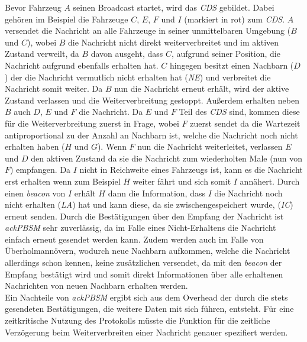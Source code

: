 \documentclass[english,runningheads,a4paper]{llncs}[2018/03/10]
\begin{document}
Bevor Fahrzeug $A$ seinen Broadcast startet, wird das \textit{CDS} gebildet.
Dabei gehören im Beispiel die Fahrzeuge $C$, $E$, $F$ und $I$ (markiert in rot) zum \textit{CDS}.
$A$ versendet die Nachricht an alle Fahrzeuge in seiner unmittelbaren Umgebung ($B$ und $C$), wobei $B$ die Nachricht nicht direkt weiterverbreitet und im aktiven Zustand verweilt, da $B$ davon ausgeht, dass $C$, aufgrund seiner Position, die Nachricht aufgrund ebenfalls erhalten hat.
$C$ hingegen besitzt einen Nachbarn ($D$) der die Nachricht vermutlich nicht erhalten hat (\textit{NE}) und verbreitet die Nachricht somit weiter.
Da $B$ nun die Nachricht erneut erhält, wird der aktive Zustand verlassen und die Weiterverbreitung gestoppt.
Außerdem erhalten neben $B$ auch $D$, $E$ und $F$ die Nachricht.
Da $E$ und $F$ Teil des \textit{CDS} sind, kommen diese für die Weiterverbreitung zuerst in Frage, wobei $F$ zuerst sendet da die Wartezeit antiproportional zu der Anzahl an Nachbarn ist, welche die Nachricht noch nicht erhalten haben ($H$ und $G$).
Wenn $F$ nun die Nachricht weiterleitet, verlassen $E$ und $D$ den aktiven Zustand da sie die Nachricht zum wiederholten Male (nun von $F$) empfangen.
Da $I$ nicht in Reichweite eines Fahrzeugs ist, kann es die Nachricht erst erhalten wenn zum Beispiel $H$ weiter fährt und sich somit $I$ annähert.
Durch einen \textit{beacon} von $I$ erhält $H$ dann die Information, dass $I$ die Nachricht noch nicht erhalten (\textit{LA}) hat und kann diese, da sie zwischengespeichert wurde, (\textit{IC}) erneut senden.
Durch die Bestätigungen über den Empfang der Nachricht ist \textit{ackPBSM} sehr zuverlässig, da im Falle eines Nicht-Erhaltens die Nachricht einfach erneut gesendet werden kann.
Zudem werden auch im Falle von Überholmannövern, wodurch neue Nachbarn aufkommen, welche die Nachricht allerdings schon kennen, keine zusätzlichen versendet, da mit den \textit{beacon} der Empfang bestätigt wird und somit direkt Informationen über alle erhaltenen Nachrichten von neuen Nachbarn erhalten werden.\\
Ein Nachteile von \textit{ackPBSM} ergibt sich aus dem Overhead der durch die stets gesendeten Bestätigungen, die weitere Daten mit sich führen, entsteht.
Für eine zeitkritische Nutzung des Protokolls müsste die Funktion für die zeitliche Verzögerung beim Weiterverbreiten einer Nachricht genauer spezifiert werden\cite{conti2013mobile}.
\end{document}
